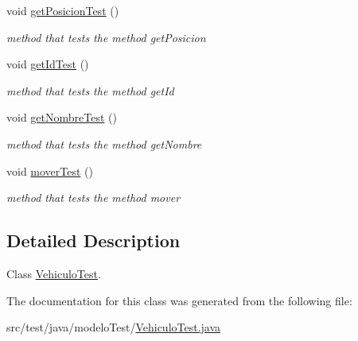 \begin{DoxyCompactItemize}
void \mbox{\hyperlink{classmodelo_test_1_1_vehiculo_test_a91fdc067b1a488b2c9daa231ac13c8a5}{get\+Posicion\+Test}} ()
\begin{DoxyCompactList}\small\item\em method that tests the method get\+Posicion \end{DoxyCompactList}\item 
\mbox{\label{classmodelo_test_1_1_vehiculo_test_a1388b013a8e907236a40d2232ed01388}} 
void \mbox{\hyperlink{classmodelo_test_1_1_vehiculo_test_a1388b013a8e907236a40d2232ed01388}{get\+Id\+Test}} ()
\begin{DoxyCompactList}\small\item\em method that tests the method get\+Id \end{DoxyCompactList}\item 
\mbox{\label{classmodelo_test_1_1_vehiculo_test_ab1733df7093a28b7049e79929112bc65}} 
void \mbox{\hyperlink{classmodelo_test_1_1_vehiculo_test_ab1733df7093a28b7049e79929112bc65}{get\+Nombre\+Test}} ()
\begin{DoxyCompactList}\small\item\em method that tests the method get\+Nombre \end{DoxyCompactList}\item 
\mbox{\label{classmodelo_test_1_1_vehiculo_test_a6cda67e5362be0afab0f8c793dd7d862}} 
void \mbox{\hyperlink{classmodelo_test_1_1_vehiculo_test_a6cda67e5362be0afab0f8c793dd7d862}{mover\+Test}} ()
\begin{DoxyCompactList}\small\item\em method that tests the method mover \end{DoxyCompactList}\end{DoxyCompactItemize}


\subsection{Detailed Description}
Class \mbox{\hyperlink{classmodelo_test_1_1_vehiculo_test}{Vehiculo\+Test}}. 

The documentation for this class was generated from the following file\+:\begin{DoxyCompactItemize}
\item 
src/test/java/modelo\+Test/\mbox{\hyperlink{_vehiculo_test_8java}{Vehiculo\+Test.\+java}}\end{DoxyCompactItemize}

